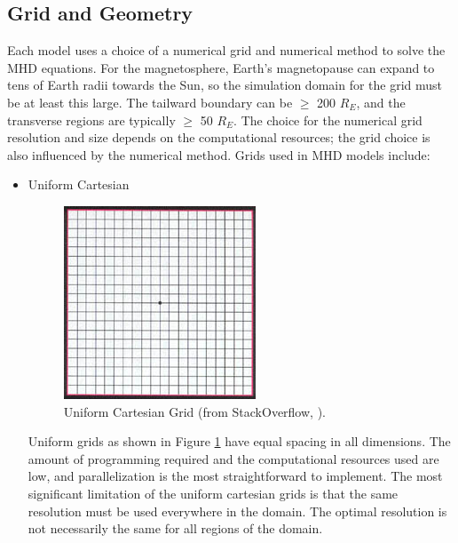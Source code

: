 \subsection{Grid and Geometry}
Each model uses a choice of a numerical grid and numerical method to solve the MHD equations. For the
magnetosphere, Earth's magnetopause can expand to tens of Earth radii
towards the Sun, so the simulation domain for the grid must be at least this large.
The tailward boundary can be $\ge$ 200 $R_E$, and the transverse regions are
typically $\ge$ 50 $R_E$. The choice for the numerical grid resolution and size
depends on the computational resources; the grid choice is also influenced by
the numerical method. Grids used in MHD models include:
\begin{itemize}
  \item Uniform Cartesian \\
  \begin{figure}
  	\begin{centering}
  	\includegraphics[]{images/UniformCartesian.jpg}
  	\caption{Uniform Cartesian Grid (from StackOverflow, \citeyear{UnifCart}).}
  	\label{fig:UniformCartesian}
  	\end{centering}
  	\figSpace
  \end{figure}
  Uniform grids as shown in Figure \ref{fig:UniformCartesian} have equal spacing
  in all dimensions.
  The amount of programming required and the computational resources used are low, and parallelization is the most straightforward to implement. The most significant limitation of the uniform cartesian
  grids is that the same resolution must be used everywhere in the domain. The optimal
  resolution is not necessarily the same for all regions of the domain.
  

\end{itemize}
